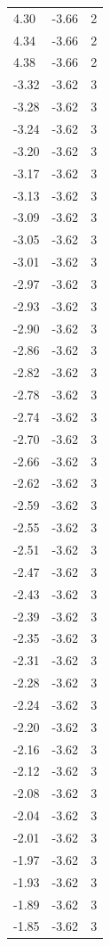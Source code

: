 \begin{longtable}{lrr}
  4.30 & -3.66 & 2 \\
  4.34 & -3.66 & 2 \\
  4.38 & -3.66 & 2 \\
  -3.32 & -3.62 & 3 \\
  -3.28 & -3.62 & 3 \\
  -3.24 & -3.62 & 3 \\
  -3.20 & -3.62 & 3 \\
  -3.17 & -3.62 & 3 \\
  -3.13 & -3.62 & 3 \\
  -3.09 & -3.62 & 3 \\
  -3.05 & -3.62 & 3 \\
  -3.01 & -3.62 & 3 \\
  -2.97 & -3.62 & 3 \\
  -2.93 & -3.62 & 3 \\
  -2.90 & -3.62 & 3 \\
  -2.86 & -3.62 & 3 \\
  -2.82 & -3.62 & 3 \\
  -2.78 & -3.62 & 3 \\
  -2.74 & -3.62 & 3 \\
  -2.70 & -3.62 & 3 \\
  -2.66 & -3.62 & 3 \\
  -2.62 & -3.62 & 3 \\
  -2.59 & -3.62 & 3 \\
  -2.55 & -3.62 & 3 \\
  -2.51 & -3.62 & 3 \\
  -2.47 & -3.62 & 3 \\
  -2.43 & -3.62 & 3 \\
  -2.39 & -3.62 & 3 \\
  -2.35 & -3.62 & 3 \\
  -2.31 & -3.62 & 3 \\
  -2.28 & -3.62 & 3 \\
  -2.24 & -3.62 & 3 \\
  -2.20 & -3.62 & 3 \\
  -2.16 & -3.62 & 3 \\
  -2.12 & -3.62 & 3 \\
  -2.08 & -3.62 & 3 \\
  -2.04 & -3.62 & 3 \\
  -2.01 & -3.62 & 3 \\
  -1.97 & -3.62 & 3 \\
  -1.93 & -3.62 & 3 \\
  -1.89 & -3.62 & 3 \\
  -1.85 & -3.62 & 3 \\

\end{longtable}
